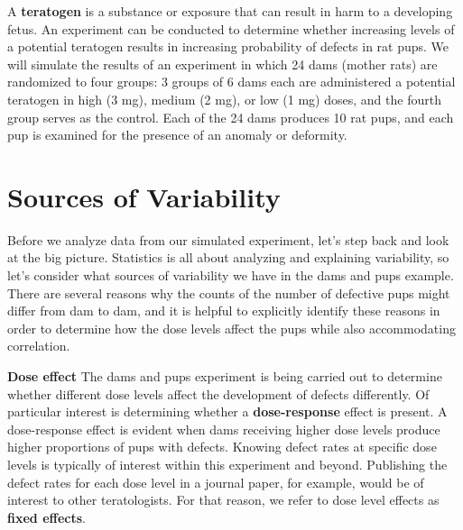 \documentclass[
]{krantz}
\begin{document}
A \textbf{teratogen} is a substance or exposure that can result in harm to a developing fetus. An experiment can be conducted to determine whether increasing levels of a potential teratogen results in increasing probability of defects in rat pups. We will simulate the results of an experiment in which 24 dams (mother rats) are randomized to four groups: 3 groups of 6 dams each are administered a potential teratogen in high (3 mg), medium (2 mg), or low (1 mg) doses, and the fourth group serves as the control. Each of the 24 dams produces 10 rat pups, and each pup is examined for the presence of an anomaly or deformity.

\hypertarget{sources-of-variability}{%
\section{Sources of Variability}\label{sources-of-variability}}

Before we analyze data from our simulated experiment, let's step back and look at the big picture. Statistics is all about analyzing and explaining variability, so let's consider what sources of variability we have in the dams and pups example. There are several reasons why the counts of the number of defective pups might differ from dam to dam, and it is helpful to explicitly identify these reasons in order to determine how the dose levels affect the pups while also accommodating correlation.

\textbf{Dose effect} The dams and pups experiment is being carried out to determine whether different dose levels affect the development of defects differently. Of particular interest is determining whether a \textbf{dose-response}  effect is present. A dose-response effect is evident when dams receiving higher dose levels produce higher proportions of pups with defects. Knowing defect rates at specific dose levels is typically of interest within this experiment and beyond. Publishing the defect rates for each dose level in a journal paper, for example, would be of interest to other teratologists. For that reason, we refer to dose level effects as \textbf{fixed effects}. 
\end{document}
